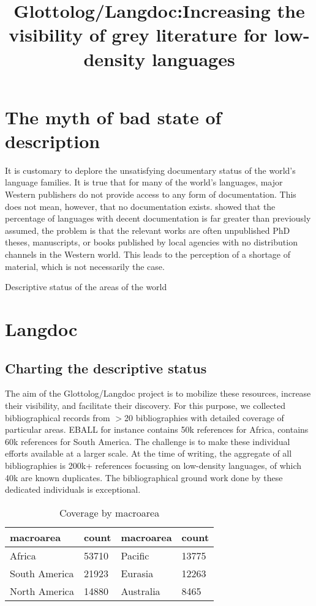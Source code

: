 \documentclass[10pt, a4paper]{article}
\title{Glottolog/Langdoc:Increasing the visibility of grey literature for low-density languages}
\begin{document}
 

\section{The myth of bad state of description}

It is customary to deplore the unsatisfying documentary status of the world's
language families. It is true that for many of the world's languages, major Western
publishers do not provide access to any form of documentation. This does
not mean, however, that no documentation exists. \cite{HammarstroemEtAl2011leiden} showed that the percentage of languages with decent documentation
is far greater than previously assumed, the problem is that the relevant works
are often unpublished PhD theses, manuscripts, or books published by local
agencies with no distribution channels in the Western world. This leads to the
perception of a shortage of material, which is not necessarily the case. 

\begin{table}
 
\caption{Descriptive status of the areas of the world}
\end{table}


\section{Langdoc}
\subsection{Charting the descriptive status}

The aim
of the Glottolog/Langdoc project is to mobilize these resources, increase their
visibility, and facilitate their discovery. For this purpose, we collected bibliographical
records from $>$20 bibliographies with detailed coverage of particular
areas. EBALL \cite{Maho} for instance contains 50k references for Africa, \cite{Fabre2005}
contains 60k references for South America. The challenge is to make these individual
efforts available at a larger scale. At the time of writing, the aggregate of all bibliographies is 200k+
references focussing on low-density languages, of which 40k are known duplicates.
The bibliographical ground work done by these dedicated individuals is exceptional.


\begin{table}
  \begin{tabular}{ll||ll}
    macroarea   & count &  macroarea   & count \\
  \hline
  Africa         & 53710  &   Pacific        & 13775 \\
  South America  & 21923  &   Eurasia        & 12263  \\
  North America  & 14880  &   Australia      &  8465  \\
  \end{tabular}
 \caption{Coverage by macroarea}
\end{table}
\end{document}
